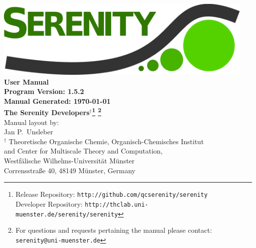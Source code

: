 \documentclass[bibliography=totocnumbered,a4paper,10pt,oneside]{scrbook}
\begin{document}
\thispagestyle{empty}
\begin{center}
\vspace*{1cm}
\includegraphics[width=0.95\textwidth]{./figs/SerenityLogo.png}\\
\vspace{2cm}
{\LARGE\textbf{
User Manual
}}\\
\vspace{1cm}
{\large\textbf{
Program Version: 1.5.2\\
Manual Generated: \today
}}\\
\vspace{2cm}
{\large\textbf{
The Serenity Developers$^{\dagger}$\footnote{Release Repository: \texttt{http://github.com/qcserenity/serenity}\\
                                             Developer Repository: \texttt{http://thclab.uni-muenster.de/serenity/serenity}}
\footnote{For questions and requests pertaining the manual please contact:\\ \texttt{serenity@uni-muenster.de}}
}}\\
\vspace{2cm}
{\large Manual layout by: \\
Jan P.\ Unsleber
}
\\[2ex]

$^{\dagger}$ Theoretische Organische Chemie,
Organisch-Chemisches Institut \\
and Center for Multiscale Theory and Computation,\\
Westf\"alische Wilhelms-Universit\"at M\"unster\\
Corrensstra{\ss}e 40, 48149 M\"unster, Germany\\[2ex]

\vfill
\end{center}
\newpage
{}
\setcounter{page}{1}
\tableofcontents

\newpage
{}
\setcounter{page}{1}
\end{document}
